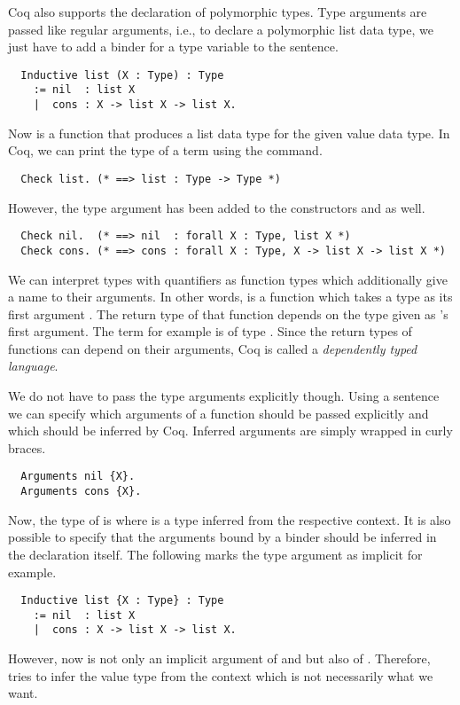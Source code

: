 Coq also supports the declaration of polymorphic types.
Type arguments are passed like regular arguments, i.e., to declare a polymorphic list data type, we just have to add a binder for a type variable to the  sentence.
\begin{verbatim}
  Inductive list (X : Type) : Type
    := nil  : list X
    |  cons : X -> list X -> list X.
\end{verbatim}
Now  is a function that produces a list data type for the given value data type.
In Coq, we can print the type of a term using the  command.
\begin{verbatim}
  Check list. (* ==> list : Type -> Type *)
\end{verbatim}
However, the type argument  has been added to the constructors  and  as well.
\begin{verbatim}
  Check nil.  (* ==> nil  : forall X : Type, list X *)
  Check cons. (* ==> cons : forall X : Type, X -> list X -> list X *)
\end{verbatim}
We can interpret types with  quantifiers as function types which additionally give a name to their arguments.
In other words,  is a function which takes a type as its first argument .
The return type of that function depends on the type given as 's first argument.
The term  for example is of type .
Since the return types of functions can depend on their arguments, Coq is called a \textit{dependently typed language}.

We do not have to pass the type arguments explicitly though.
Using a  sentence we can specify which arguments of a function should be passed explicitly and which should be inferred by Coq.
Inferred arguments are simply wrapped in curly braces.
\begin{verbatim}
  Arguments nil {X}.
  Arguments cons {X}.
\end{verbatim}
Now, the type of  is  where  is a type inferred from the respective context.
It is also possible to specify that the arguments bound by a binder should be inferred in the declaration itself.
The following marks the type argument  as implicit for example.
\begin{verbatim}
  Inductive list {X : Type} : Type
    := nil  : list X
    |  cons : X -> list X -> list X.
\end{verbatim}
However, now  is not only an implicit argument of  and  but also of .
Therefore,  tries to infer the value type from the context which is not necessarily what we want.

